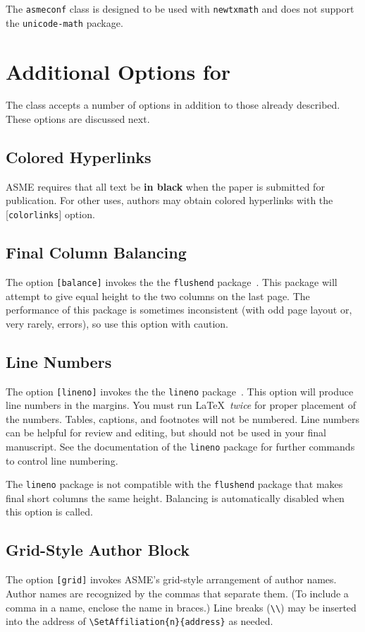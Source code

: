 \documentclass[captionpatch,colorlinks,upint,subscriptcorrection,varvw,german]{asmeconf}
\begin{document}
The \texttt{asmeconf} class is designed to be used with \texttt{newtxmath} and does not support the \texttt{unicode-math} package.



\section{Additional Options for }
The class accepts a number of options in addition to those already described. These options are discussed next.

\subsection{Colored Hyperlinks}
ASME requires that all text be \textbf{in black} when the paper is submitted for publication.  For other uses, authors may
obtain colored hyperlinks with the [\texttt{colorlinks}] option.

\subsection{Final Column Balancing} The option \texttt{[balance]} invokes the the \texttt{flushend} package~\cite{tolusis}.
This package will attempt to give equal height to the two columns on the last page. The performance of this package is sometimes inconsistent (with odd page layout or, very rarely, errors), so use this option with caution.

\subsection{Line Numbers} The option \texttt{[lineno]} invokes the the \texttt{lineno} package~\cite{bottcher}. This option will produce line numbers in the margins. You must run \LaTeX\ \textit{twice} for proper placement of the numbers. Tables, captions, and footnotes will not be numbered.  Line numbers can be helpful for review and editing, but should not be used in your final manuscript. See the documentation of the \texttt{lineno} package for further commands to control line numbering.

The \texttt{lineno} package is not compatible with the \texttt{flushend} package that makes final short columns the same height. Balancing is automatically disabled when this option is called.

\subsection{Grid-Style Author Block} The option \texttt{[grid]} invokes ASME's grid-style arrangement of author names. Author names are recognized by the commas that separate them. (To include a comma in a name, enclose the name in braces.) Line breaks (\verb|\\|) may be inserted into the address of \verb|\SetAffiliation{n}{address}| as needed.
\end{document}
